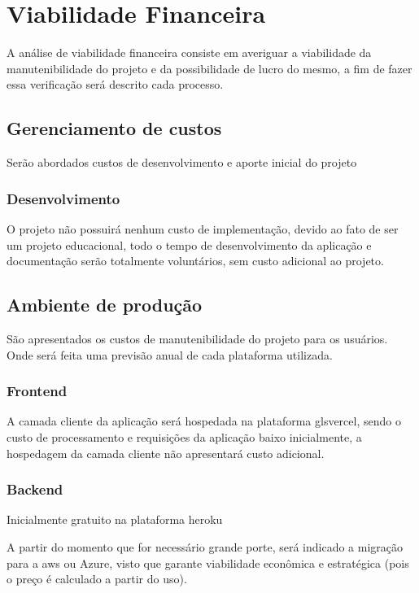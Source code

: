 \section{Viabilidade Financeira}
A análise de viabilidade financeira consiste em averiguar a viabilidade da manutenibilidade do projeto
e da possibilidade de lucro do mesmo, a fim de fazer essa verificação será descrito cada processo.

\subsection{Gerenciamento de custos}
Serão abordados custos de desenvolvimento e aporte inicial do projeto

\subsubsection{Desenvolvimento}
O projeto não possuirá nenhum custo de implementação, devido ao fato de ser um projeto educacional,
todo o tempo de desenvolvimento da aplicação e documentação serão totalmente voluntários, sem custo adicional ao projeto.

\subsection{Ambiente de produção}
São apresentados os custos de manutenibilidade do projeto para os usuários. 
Onde será feita uma previsão anual de cada plataforma utilizada.

\subsubsection{Frontend}
A camada cliente da aplicação será hospedada na plataforma gls{vercel}, sendo o custo de processamento e requisições da aplicação
baixo inicialmente, a hospedagem da camada cliente não apresentará custo adicional.

\subsubsection{Backend}
Inicialmente gratuito na plataforma \gls{heroku}

A partir do momento que for necessário grande porte, será indicado a migração para a \gls{aws} ou Azure,
visto que garante viabilidade econômica e estratégica (pois o
preço é calculado a partir do uso).

